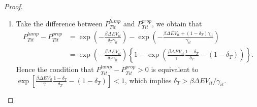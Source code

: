 \documentclass[11pt]{article}
\begin{document}
\begin{proof}
\begin{enumerate}
        \item Take the difference between $P_{Tit}^{lump}$ and $P_{Tit}^{prop}$, we obtain that
            \begin{align*}
                P_{Tit}^{lump}-P_{Tit}^{prop}
                    &=\exp\left(-\frac{\beta \Delta EV_{it}}{\delta_T\gamma_{it}}\right)-\exp \left(-\frac{\beta \Delta EV_{it}+(1-\delta_T)\gamma_{it}} {\gamma_{it}}\right) \\
                    &=\exp\left(-\frac{\beta \Delta EV_{it}}{\delta_T\gamma_{it}}\right)\left\{1-\exp\left(\frac{\beta \Delta EV_{it}}{\gamma}\frac{1-\delta_T}{\delta_T}-(1-\delta_T)\right)\right\}.
            \end{align*}
            Hence the condition that $P_{Tit}^{lump}-P_{Tit}^{prop}>0$ is equivalent to $\exp\left[\frac{\beta \Delta EV_{it}}{\gamma}\frac{1-\delta_T}{\delta_T}-(1-\delta_T)\right]<1$, which implies $\delta_T>\beta \Delta EV_{it}/\gamma_{it}$.
    \end{enumerate}
\end{proof}
\end{document}
